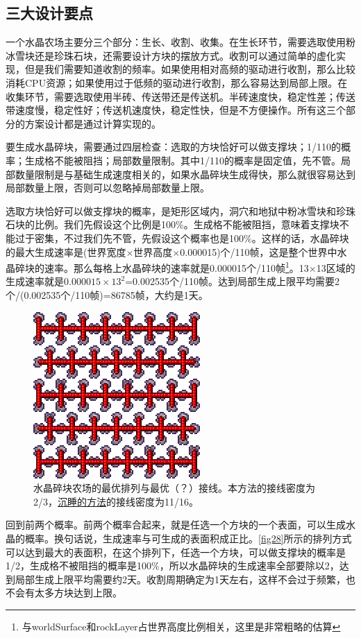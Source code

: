\subsection{三大设计要点}
一个水晶农场主要分三个部分：生长、收割、收集。在生长环节，需要选取使用粉冰雪块还是珍珠石块，还需要设计方块的摆放方式。收割可以通过简单的虚化实现，但是我们需要知道收割的频率。如果使用相对高频的驱动进行收割，那么比较消耗CPU资源；如果使用过于低频的驱动进行收割，那么容易达到局部上限。在收集环节，需要选取使用半砖、传送带还是传送机。半砖速度快，稳定性差；传送带速度慢，稳定性好；传送机速度快，稳定性快，但是不方便操作。所有这三个部分的方案设计都是通过计算实现的。

要生成水晶碎块，需要通过四层检查：选取的方块恰好可以做支撑块；1/110的概率；生成格不能被阻挡；局部数量限制。其中1/110的概率是固定值，先不管。局部数量限制是与基础生成速度相关的，如果水晶碎块生成得快，那么就很容易达到局部数量上限，否则可以忽略掉局部数量上限。

选取方块恰好可以做支撑块的概率，是矩形区域内，洞穴和地狱中粉冰雪块和珍珠石块的比例。我们先假设这个比例是100\%。生成格不能被阻挡，意味着支撑块不能过于密集，不过我们先不管，先假设这个概率也是100\%。这样的话，水晶碎块的最大生成速率是(世界宽度$\times$世界高度$\times$0.000015)个/110帧，这是整个世界中水晶碎块的速率。那么每格上水晶碎块的速率就是0.000015个/110帧\footnote{与worldSurface和rockLayer占世界高度比例相关，这里是非常粗略的估算}。13$\times$13区域的生成速率就是$0.000015\times 13^2$=0.002535个/110帧。达到局部生成上限平均需要2个/(0.002535个/110帧)=86785帧，大约是1天。

\begin{figure}
\centering
\includegraphics{images/395.png}
\caption{水晶碎块农场的最优排列与最优（？）接线。本方法的接线密度为2/3，\href{https://www.bilibili.com/video/av57287619}{沉睡的方法}的接线密度为11/16。}\label{fig28}
\end{figure}

回到前两个概率。前两个概率合起来，就是任选一个方块的一个表面，可以生成水晶的概率。换句话说，生成速率与可生成的表面积成正比。\autoref{fig28}所示的排列方式可以达到最大的表面积，在这个排列下，任选一个方块，可以做支撑块的概率是1/2，生成格不被阻挡的概率是100\%，所以水晶碎块的生成速率全部要除以2，达到局部生成上限平均需要约2天。收割周期确定为1天左右，这样不会过于频繁，也不会有太多方块达到上限。

